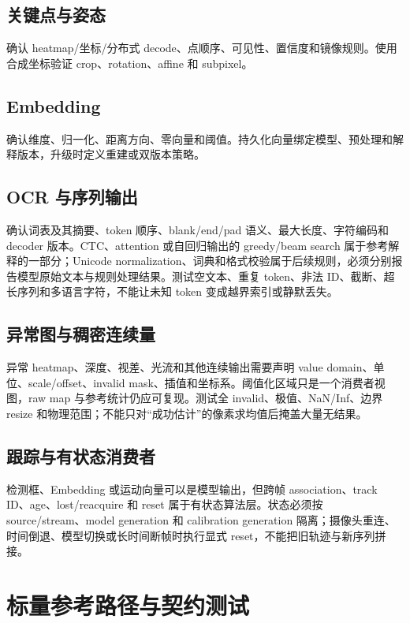 \subsection{关键点与姿态}

确认 heatmap/坐标/分布式 decode、点顺序、可见性、置信度和镜像规则。使用合成坐标验证 crop、rotation、affine 和 subpixel。

\subsection{Embedding}

确认维度、归一化、距离方向、零向量和阈值。持久化向量绑定模型、预处理和解释版本，升级时定义重建或双版本策略。

\subsection{OCR 与序列输出}

确认词表及其摘要、token 顺序、blank/end/pad 语义、最大长度、字符编码和 decoder 版本。CTC、attention 或自回归输出的 greedy/beam search 属于参考解释的一部分；Unicode normalization、词典和格式校验属于后续规则，必须分别报告模型原始文本与规则处理结果。测试空文本、重复 token、非法 ID、截断、超长序列和多语言字符，不能让未知 token 变成越界索引或静默丢失。

\subsection{异常图与稠密连续量}

异常 heatmap、深度、视差、光流和其他连续输出需要声明 value domain、单位、scale/offset、invalid mask、插值和坐标系。阈值化区域只是一个消费者视图，raw map 与参考统计仍应可复现。测试全 invalid、极值、NaN/Inf、边界 resize 和物理范围；不能只对“成功估计”的像素求均值后掩盖大量无结果。

\subsection{跟踪与有状态消费者}

检测框、Embedding 或运动向量可以是模型输出，但跨帧 association、track ID、age、lost/reacquire 和 reset 属于有状态算法层。状态必须按 source/stream、model generation 和 calibration generation 隔离；摄像头重连、时间倒退、模型切换或长时间断帧时执行显式 reset，不能把旧轨迹与新序列拼接。

\section{标量参考路径与契约测试}

